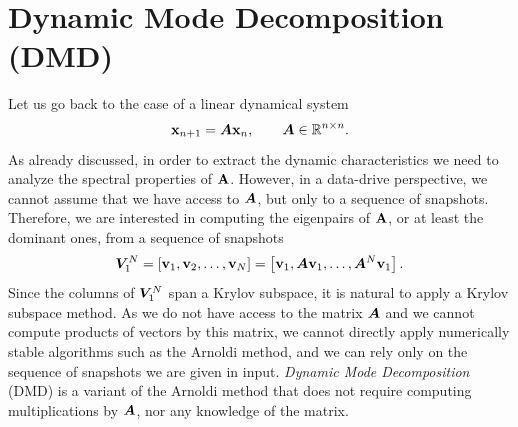 \section{Dynamic Mode Decomposition (DMD)}
Let us go back to the case of a linear dynamical system
\begin{equation*}
    \vb{x}_{n+1} = \vb*{A}\vb{x}_n, \qquad \vb*{A}\in\mathbb{R}^{n\times n}.
\end{equation*}
As already discussed, in order to extract the dynamic characteristics we need to analyze the spectral properties of $\vb{A}$. However, in a data-drive perspective, we cannot assume that we have access to $\vb*{A}$, but only to a sequence of snapshots. Therefore, we are interested in computing the eigenpairs of $\vb{A}$, or at least the dominant ones, from a sequence of snapshots
\begin{equation*}
    \label{krylov_space}
    \vb*{V}_1^N = \left[\vb{v}_1, \vb{v}_2, \dots, \vb{v}_N\right] = \left[\vb{v}_1, \vb*{A}\vb{v}_1, \dots, \vb*{A}^N\vb{v}_1\right].
\end{equation*}
Since the columns of $\vb*{V}_1^N$ span a Krylov subspace, it is natural to apply a Krylov subspace method. As we do not have access to the matrix $\vb*{A}$ and we cannot compute products of vectors by this matrix, we cannot directly apply numerically stable algorithms such as the Arnoldi method, and we can rely only on the sequence of snapshots we are given in input. \emph{Dynamic Mode Decomposition} (DMD) \cite{schmid_dynamic_2010} is a variant of the Arnoldi method that does not require computing multiplications by $\vb*{A}$, nor any knowledge of the matrix. 

